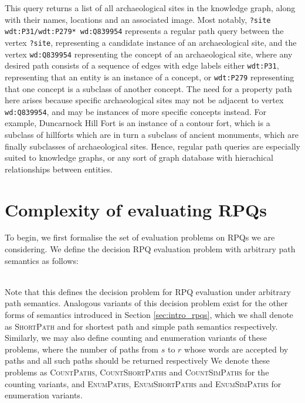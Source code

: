 \documentclass{article}
\begin{document}
This query returns a list of all archaeological sites in the knowledge graph, along with their names, locations and an associated image. Most notably, \texttt{?site wdt:P31/wdt:P279* wd:Q839954} represents a regular path query between the vertex \texttt{?site}, representing a candidate instance of an archaeological site, and the vertex \texttt{wd:Q839954} representing the concept of an archaeological site, where any desired path consists of a sequence of edges with edge labels either \texttt{wdt:P31}, representing that an entity is an instance of a concept, or \texttt{wdt:P279} representing that one concept is a subclass of another concept. The need for a property path here arises because specific archaeological sites may not be adjacent to vertex \texttt{wd:Q839954}, and may be instances of more specific concepts instead. For example, Duncarnock Hill Fort is an instance of a contour fort, which is a subclass of hillforts which are in turn a subclass of ancient monuments, which are finally subclasses of archaeological sites. Hence, regular path queries are especially suited to knowledge graphs, or any sort of graph database with hierachical relationships between entities.

\section{Complexity of evaluating RPQs}
\label{sec:complexity}

To begin, we first formalise the set of evaluation problems on RPQs we are considering. We define the decision RPQ evaluation problem with arbitrary path semantics as follows:

 \\

Note that this defines the decision problem for RPQ evaluation under arbitrary path semantics. Analogous variants of this decision problem exist for the other forms of semantics introduced in Section \ref{sec:intro_rpqs}, which we shall denote as \textsc{ShortPath} and  for shortest path and simple path semantics respectively. Similarly, we may also define counting and enumeration variants of these problems, where the number of paths from $s$ to $r$ whose words are accepted by paths and all such paths should be returned respectively We denote these problems as \textsc{CountPaths}, \textsc{CountShortPaths} and \textsc{CountSimPaths} for the counting variants, and \textsc{EnumPaths}, \textsc{EnumShortPaths} and \textsc{EnumSimPaths} for enumeration variants.
\end{document}
